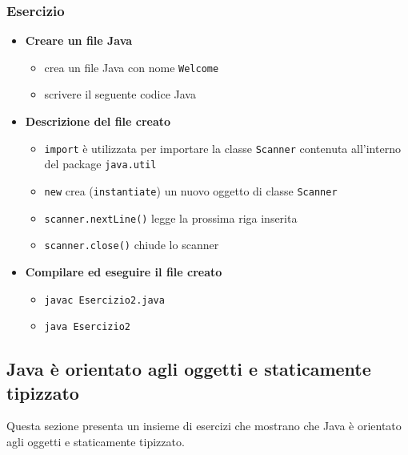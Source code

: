 \documentclass{article}
\theoremstyle{definition}
\begin{document}
\subsubsection{Esercizio}

\begin{itemize}
\item \textbf{Creare un file Java}
\begin{itemize}
\item crea un file Java con nome \texttt{Welcome}
\item scrivere il seguente codice Java
\end{itemize}
\end{itemize}


\begin{itemize}
\item \textbf{Descrizione del file creato}
\begin{itemize}
\item \texttt{import} \`e utilizzata per importare la classe \texttt{Scanner} contenuta all'interno del package \texttt{java.util}
\item \texttt{new} crea (\texttt{instantiate}) un nuovo oggetto di classe \texttt{Scanner}
\item \texttt{scanner.nextLine()} legge la prossima riga inserita
\item \texttt{scanner.close()} chiude lo scanner
\end{itemize}
\end{itemize}

\begin{itemize}
\item  \textbf{Compilare ed eseguire il file creato}
\begin{itemize}
\item \texttt{javac Esercizio2.java}
\item \texttt{java Esercizio2}
\end{itemize}
\end{itemize}

\subsection{Java \`e orientato agli oggetti e staticamente tipizzato}
Questa sezione presenta un insieme di esercizi che mostrano che Java \`e orientato agli oggetti e staticamente tipizzato.
\end{document}
